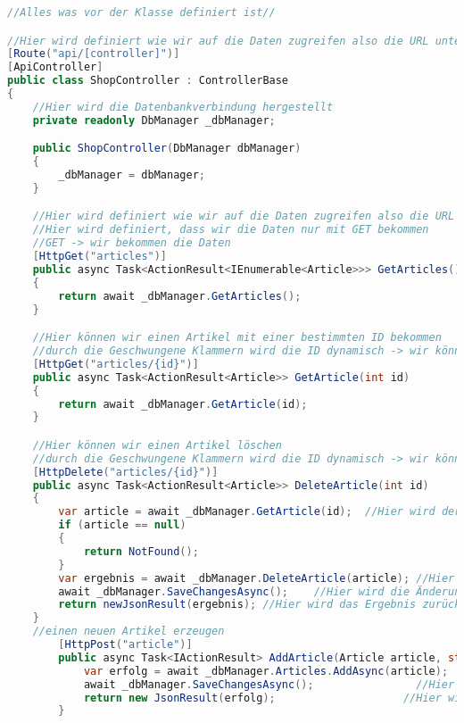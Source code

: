 \documentclass[a4paper,12pt]{report}
\begin{document}
\begin{lstlisting}[language=csharp, caption=Beispiel für einen API-Controller in C\#]
//Alles was vor der Klasse definiert ist//

//Hier wird definiert wie wir auf die Daten zugreifen also die URL unter der wir die ganze Klasse erreichen
[Route("api/[controller]")]
[ApiController]
public class ShopController : ControllerBase
{
    //Hier wird die Datenbankverbindung hergestellt
    private readonly DbManager _dbManager;

    public ShopController(DbManager dbManager)
    {
        _dbManager = dbManager;
    }

    //Hier wird definiert wie wir auf die Daten zugreifen also die URL unter der wir die Methode erreichen
    //Hier wird definiert, dass wir die Daten nur mit GET bekommen
    //GET -> wir bekommen die Daten
    [HttpGet("articles")]
    public async Task<ActionResult<IEnumerable<Article>>> GetArticles()
    {
        return await _dbManager.GetArticles();
    }

    //Hier können wir einen Artikel mit einer bestimmten ID bekommen
    //durch die Geschwungene Klammern wird die ID dynamisch -> wir können jede ID eingeben
    [HttpGet("articles/{id}")]
    public async Task<ActionResult<Article>> GetArticle(int id)
    {
        return await _dbManager.GetArticle(id);
    }

    //Hier können wir einen Artikel löschen
    //durch die Geschwungene Klammern wird die ID dynamisch -> wir können jede ID eingeben
    [HttpDelete("articles/{id}")]
    public async Task<ActionResult<Article>> DeleteArticle(int id)
    {
        var article = await _dbManager.GetArticle(id);  //Hier wird der Artikel mit der ID geholt
        if (article == null)
        {
            return NotFound();
        }
        var ergebnis = await _dbManager.DeleteArticle(article); //Hier wird der Artikel gelöscht
        await _dbManager.SaveChangesAsync();    //Hier wird die Änderung in der Datenbank gespeichert
        return newJsonResult(ergebnis); //Hier wird das Ergebnis zurückgegeben -> true oder false
    }
    //einen neuen Artikel erzeugen
        [HttpPost("article")]
        public async Task<IActionResult> AddArticle(Article article, string apiKey){
            var erfolg = await _dbManager.Articles.AddAsync(article);   //Hier wird der Artikel hinzugefügt
            await _dbManager.SaveChangesAsync();                //Hier wird die Änderung in der Datenbank gespeichert
            return new JsonResult(erfolg);                    //Hier wird das Ergebnis zurückgegeben -> true oder false
        }


\end{lstlisting}
\end{document}
